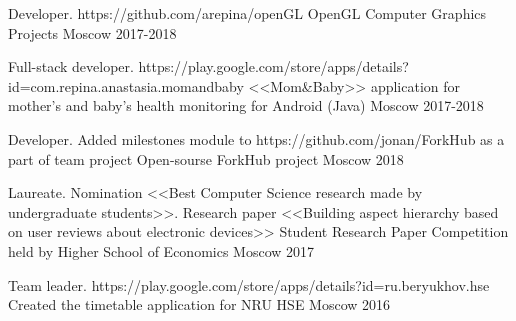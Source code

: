 


\vspace{0cm}\begin{cventries}
	

\cventry
{Developer. https://github.com/arepina/openGL} %
{OpenGL Computer Graphics Projects} %
{Moscow} %
{2017-2018} %
{}
		
	
\cventry
{Full-stack developer. https://play.google.com/store/apps/details?id=com.repina.anastasia.momandbaby} %
{<<Mom\&Baby>> application for mother's and baby's health monitoring for Android  (Java) } %
{Moscow} %
{2017-2018} %
{}
	

\cventry
{Developer. Added milestones module to https://github.com/jonan/ForkHub as a part of team project} %
{Open-sourse ForkHub project} %
{Moscow} %
{2018} %
{}

\cventry
{Laureate. Nomination <<Best Computer Science research made by undergraduate students>>. Research paper <<Building aspect hierarchy based on user reviews about electronic devices>>} %
{Student Research Paper Competition held by Higher School of Economics} %
{Moscow} %
{2017} %
{}

\cventry
{Team leader. https://play.google.com/store/apps/details?id=ru.beryukhov.hse} %
{Created the timetable application for NRU HSE} %
{Moscow} %
{2016} %
{}



\end{cventries}
